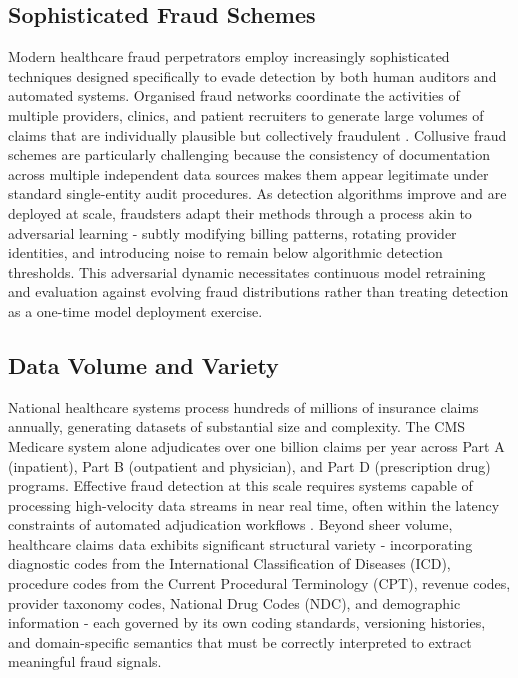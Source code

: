 \subsection{Sophisticated Fraud Schemes}

Modern healthcare fraud perpetrators employ increasingly sophisticated techniques designed specifically to evade detection by both human auditors and automated systems. Organised fraud networks coordinate the activities of multiple providers, clinics, and patient recruiters to generate large volumes of claims that are individually plausible but collectively fraudulent \cite{choi2020}. Collusive fraud schemes are particularly challenging because the consistency of documentation across multiple independent data sources makes them appear legitimate under standard single-entity audit procedures. As detection algorithms improve and are deployed at scale, fraudsters adapt their methods through a process akin to adversarial learning - subtly modifying billing patterns, rotating provider identities, and introducing noise to remain below algorithmic detection thresholds. This adversarial dynamic necessitates continuous model retraining and evaluation against evolving fraud distributions rather than treating detection as a one-time model deployment exercise.

\subsection{Data Volume and Variety}

National healthcare systems process hundreds of millions of insurance claims annually, generating datasets of substantial size and complexity. The CMS Medicare system alone adjudicates over one billion claims per year across Part A (inpatient), Part B (outpatient and physician), and Part D (prescription drug) programs. Effective fraud detection at this scale requires systems capable of processing high-velocity data streams in near real time, often within the latency constraints of automated adjudication workflows \cite{kumar2020}. Beyond sheer volume, healthcare claims data exhibits significant structural variety - incorporating diagnostic codes from the International Classification of Diseases (ICD), procedure codes from the Current Procedural Terminology (CPT), revenue codes, provider taxonomy codes, National Drug Codes (NDC), and demographic information - each governed by its own coding standards, versioning histories, and domain-specific semantics that must be correctly interpreted to extract meaningful fraud signals.

